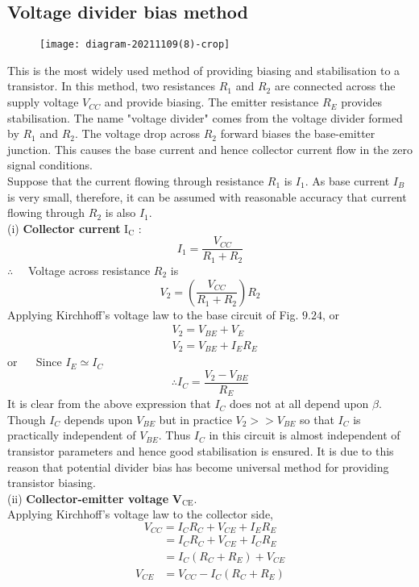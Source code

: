     \subsection{Voltage divider bias method}
   \begin{figure}[H]
   	\centering
   	\texttt{[image: diagram-20211109(8)-crop]}
   	\caption{}
   	\label{}
   \end{figure}
    This is the most widely used method of providing biasing and stabilisation to a transistor. In this method, two resistances $R_{1}$ and $R_{2}$ are connected across the supply voltage $V_{C C}$ and provide biasing. The emitter resistance $R_{E}$ provides stabilisation. The name "voltage divider" comes from the voltage divider formed by $R_{1}$ and $R_{2}$. The voltage drop across $R_{2}$ forward biases the base-emitter junction. This causes the base current and hence collector current flow in the zero signal conditions.\\
     Suppose that the current flowing through resistance $R_{1}$ is $I_{1} .$ As base current $I_{B}$ is very small, therefore, it can be assumed with reasonable accuracy that current flowing through $R_{2}$ is also $I_{1}$.\\
    (i) \textbf{Collector current} $\mathrm{I}_{\mathrm{C}}$ :
    $$
    I_{1}=\frac{V_{C C}}{R_{1}+R_{2}}
    $$
    $\therefore \quad$ Voltage across resistance $R_{2}$ is
    $$
    V_{2}=\left(\frac{V_{C C}}{R_{1}+R_{2}}\right) R_{2}
    $$
    Applying Kirchhoff's voltage law to the base circuit of Fig. $9.24$,
    or
    $$
    \begin{aligned}
    &V_{2}=V_{B E}+V_{E} \\
    &V_{2}=V_{B E}+I_{E} R_{E}
    \end{aligned}
    $$
    or $\quad$ Since $I_{E} \simeq I_{C}$ 
    $$\therefore I_{C}=\frac{V_{2}-V_{B E}}{R_{E}}$$
   It is clear from the above expression that $I_{C}$ does not at all depend upon $\beta$. Though $I_{C}$ depends upon $V_{B E}$ but in practice $V_{2}>>V_{B E}$ so that $I_{C}$ is practically independent of $V_{B E}$. Thus $I_{C}$ in this circuit is almost independent of transistor parameters and hence good stabilisation is ensured. It is due to this reason that potential divider bias has become universal method for providing transistor biasing.\\
   (ii) \textbf{Collector-emitter voltage} $\mathbf{V}_{\mathrm{CE}}$.\\
    Applying Kirchhoff's voltage law to the collector side,
   $$
   V_{C C}=I_{C} R_{C}+V_{C E}+I_{E} R_{E}
   $$
   $$
   \begin{aligned}
   	&=I_{C} R_{C}+V_{C E}+I_{C} R_{E} \\
   	&=I_{C}\left(R_{C}+R_{E}\right)+V_{C E} \\
   	V_{C E} &=V_{C C}-I_{C}\left(R_{C}+R_{E}\right)
   \end{aligned}
   $$
